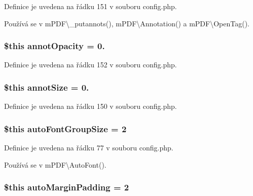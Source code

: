 Definice je uvedena na řádku 151 v souboru config.\-php.



Používá se v m\-P\-D\-F\textbackslash{}\-\_\-putannots(), m\-P\-D\-F\textbackslash{}\-Annotation() a m\-P\-D\-F\textbackslash{}\-Open\-Tag().

\hypertarget{config_8php_a388cb87bb22aff4bd572cb98d06f8ed8}{
\subsubsection[{annot\-Opacity}]{\setlength{\rightskip}{0pt plus 5cm}\$this annot\-Opacity = 0.}}\label{config_8php_a388cb87bb22aff4bd572cb98d06f8ed8}


Definice je uvedena na řádku 152 v souboru config.\-php.

\hypertarget{config_8php_aec87d4b571fd919d5940c9dd44756157}{
\subsubsection[{annot\-Size}]{\setlength{\rightskip}{0pt plus 5cm}\$this annot\-Size = 0.}}\label{config_8php_aec87d4b571fd919d5940c9dd44756157}


Definice je uvedena na řádku 150 v souboru config.\-php.

\hypertarget{config_8php_aca0ab44e957d771fe1126cb55d31ce80}{
\subsubsection[{auto\-Font\-Group\-Size}]{\setlength{\rightskip}{0pt plus 5cm}\$this auto\-Font\-Group\-Size = 2}}\label{config_8php_aca0ab44e957d771fe1126cb55d31ce80}


Definice je uvedena na řádku 77 v souboru config.\-php.



Používá se v m\-P\-D\-F\textbackslash{}\-Auto\-Font().

\hypertarget{config_8php_a96413d9f2536e015ab6e9aa606d776f1}{
\subsubsection[{auto\-Margin\-Padding}]{\setlength{\rightskip}{0pt plus 5cm}\$this auto\-Margin\-Padding = 2}}\label{config_8php_a96413d9f2536e015ab6e9aa606d776f1}


